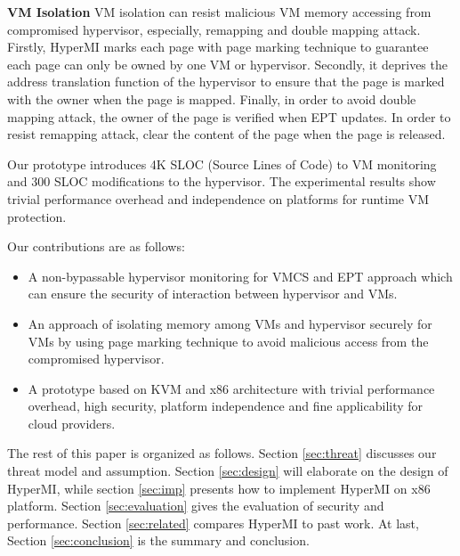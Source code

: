 \documentclass[conference]{IEEEtran}
\begin{document}
\textbf{VM Isolation}
VM isolation can resist malicious VM memory accessing from compromised hypervisor, especially, remapping and double mapping attack.
Firstly, HyperMI marks each page with page marking technique to guarantee each page can only be owned by one VM or hypervisor.
Secondly, it deprives the address translation function of the hypervisor to ensure that the page is marked with the owner when the page is mapped. 
Finally, in order to avoid double mapping attack, the owner of the page is verified when EPT updates.
In order to resist remapping attack, clear the content of the page when the page is released.



Our prototype introduces 4K SLOC (Source Lines of Code) to VM monitoring and 300 SLOC modifications to the hypervisor.
The experimental results show trivial performance overhead and independence on platforms for runtime VM protection. 


Our contributions are as follows:
\begin{itemize}
\item{A non-bypassable hypervisor monitoring for VMCS and EPT approach  which can ensure the security of interaction between hypervisor and VMs.}
\item{An approach of isolating memory among VMs and hypervisor securely for VMs by using page marking technique to avoid malicious access from the compromised hypervisor.}



\item{A prototype based on KVM and x86 architecture with trivial performance overhead, high security, platform independence and fine applicability  for cloud providers.}

\end{itemize}
The rest of this paper is organized as follows. Section \ref{sec:threat} discusses our threat model and assumption. Section \ref{sec:design} will elaborate on the design of HyperMI, while section \ref{sec:imp} presents how to implement HyperMI on x86 platform. Section \ref{sec:evaluation} gives the evaluation of security and performance. Section \ref{sec:related} compares HyperMI to past work. At last, Section \ref{sec:conclusion} is the summary and conclusion.
\end{document}
